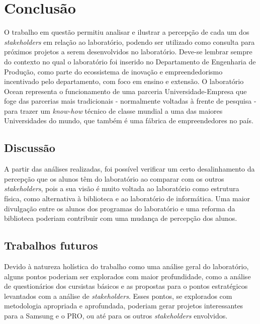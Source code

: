 \chapter{Conclusão}
\label{cha:trabalhos_futuros}

O trabalho em questão permitiu analisar e ilustrar a percepção de cada um dos \textit{stakeholders} em relação ao laboratório, podendo ser utilizado como consulta para próximos projetos a serem desenvolvidos no laboratório. Deve-se lembrar sempre do contexto no qual o laboratório foi inserido no Departamento de Engenharia de Produção, como parte do ecossistema de inovação e empreendedorismo incentivado pelo departamento, com foco em ensino e extensão. O laboratório Ocean representa o funcionamento de uma parceria Universidade-Empresa que foge das parcerias mais tradicionais - normalmente voltadas à frente de pesquisa - para trazer um \textit{know-how} técnico de classe mundial a uma das maiores Universidades do mundo, que também é uma fábrica de empreendedores no país.

\section{Discussão} %
\label{sec:discuss_o}

A partir das análises realizadas, foi possível verificar um certo desalinhamento da percepção que os alunos têm do laboratório ao comparar com os outros \textit{stakeholders}, pois a sua visão é muito voltada ao laboratório como estrutura física, como alternativa à biblioteca e ao laboratório de informática. Uma maior divulgação entre os alunos dos programas do laboratório e uma reforma da biblioteca poderiam contribuir com uma mudança de percepção dos alunos.

\section{Trabalhos futuros} %
\label{sec:trabalhos_futuros}

Devido à natureza holística do trabalho como uma análise geral do laboratório, alguns pontos poderiam ser explorados com maior profundidade, como a análise de questionários dos cursistas básicos e as propostas para o pontos estratégicos levantados com a análise de \textit{stakeholders}. Esses pontos, se explorados com metodologia apropriada e aprofundada, poderiam gerar projetos interessantes para a Samsung e o PRO, ou até para os outros \textit{stakeholders} envolvidos.